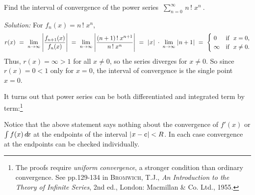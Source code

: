\begin{exmp}
\noindent Find the interval of convergence of the power series
$~\displaystyle\sum_{n=0}^{\infty} \,n\,!\;x^n~$.\vspace{1mm}
\par\noindent\emph{Solution:} For $f_n(x) = n\,!\;x^n$,
\[
r(x) ~=~ \lim_{n \to \infty} \;\Biggl|\frac{f_{n+1}(x)}{f_n(x)}\Biggr| ~=~
\lim_{n \to \infty} \;\Biggl|\frac{(n+1)\,!\;x^{n+1}}{n\,!\;x^n}\Biggr| ~=~
\lvert\mspace{1mu}x\mspace{1mu}\rvert \;\cdot\; \lim_{n \to \infty} \;\lvert\mspace{1mu}n+1\mspace{1mu}\rvert ~=~
\begin{cases} ~0 & \text{if $~x=0$,}\\~\infty & \text{if $~x \ne 0$.}\end{cases}
\]
Thus, $r(x) = \infty > 1$ for all $x \ne 0$, so the series diverges for
$x \ne 0$. So since $r(x) = 0 < 1$ only for $x=0$, the interval of
convergence is the single point $x=0$.
\end{exmp}
\divider
\vspace{2mm}

\noindent It turns out that power series can be both differentiated and
integrated term by term:\footnote{The proofs require \emph{uniform
convergence}, a stronger condition than ordinary convergence. See pp.129-134 in
\textsc{Bromwich, T.J.}, \emph{An Introduction to the Theory of Infinite
Series}, 2nd ed., London: Macmillan \& Co. Ltd., 1955.}

\newpage
Notice that the above statement says nothing about the convergence of $f'(x)$ or
$\int f(x)\,d\!x$ at the endpoints of the interval $\lvert\mspace{1mu}x-c\mspace{1mu}\rvert < R$. In each case
convergence at the endpoints can be checked individually.

